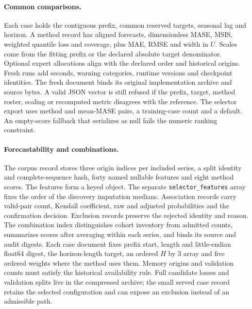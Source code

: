 \paragraph{Common comparisons.}
Each case holds the contiguous prefix, common reserved targets, seasonal lag and horizon. A method record has aligned forecasts, dimensionless MASE, MSIS, weighted quantile loss and coverage, plus MAE, RMSE and width in $U$. Scales come from the fitting prefix or the declared absolute target denominator. Optional expert allocations align with the declared order and historical origins. Fresh runs add seconds, warning categories, runtime versions and checkpoint identities. The fresh document binds its original implementation archive and source bytes. A valid JSON vector is still refused if the prefix, target, method roster, scaling or recomputed metric disagrees with the reference. The selector export uses method and mean-MASE pairs, a training-case count and a default. An empty-score fallback that serializes as null fails the numeric ranking constraint.

\paragraph{Forecastability and combinations.}
The corpus record stores three origin indices per included series, a split identity and complete-sequence hash, forty named nullable features and eight method scores. The features form a keyed object. The separate \texttt{selector\_features} array fixes the order of the discovery imputation medians. Association records carry valid-pair count, Kendall coefficient, raw and adjusted probabilities and the confirmation decision. Exclusion records preserve the rejected identity and reason. The combination index distinguishes cohort inventory from admitted counts, summarizes scores after averaging within each series, and binds its source and audit digests. Each case document fixes prefix start, length and little-endian float64 digest, the horizon-length target, an ordered $H$ by 3 array and five ordered weights where the method uses them. Memory origins and validation counts must satisfy the historical availability rule. Full candidate losses and validation splits live in the compressed archive; the small served case record retains the selected configuration and can expose an exclusion instead of an admissible path.


